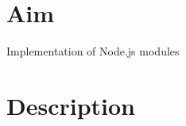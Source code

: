 \documentclass[12pt]{article}
\begin{document}
\begin{center}
\begin{tabularx}{\textwidth}{|
  >{\raggedright\arraybackslash}X|
  >{\raggedright\arraybackslash}X|
  >{\raggedright\arraybackslash}X|
  >{\raggedright\arraybackslash}X|
}
\end{tabularx}

\vfill
\hspace{0pt}
\end{center}
\thispagestyle{empty}

\clearpage
\thispagestyle{empty}


\section{Aim}
\centerline{\Large{Implementation of Node.js modules}}
\vspace{2cm}


\section{Description}
\end{document}
